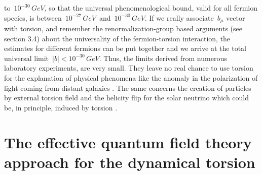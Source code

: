 to $\,10^{-30}\,GeV$, so that the universal phenomenological
bound, valid for all fermion species, is between $\,10^{-27}\,GeV\,$
and $\,10^{-30}\,GeV$. If we really associate $\,b_\mu$ vector 
with torsion, and remember the renormalization-group
based arguments (see section 3.4) about the universality 
of the fermion-torsion interaction, the estimates for different
fermions can be put together and we arrive at the total universal
limit $\,\left|b\right| < 10^{-30}\,GeV$.
Thus, the limits derived from numerous laboratory experiments, are 
very small. They leave no real chance to use torsion for the 
explanation of physical phenomena \cite{doma} like the anomaly in 
the polarization of light coming from distant galaxies 
\cite{nodrol}. The same concerns the creation of particles by 
external torsion field \cite{rump} and the helicity flip for the 
solar neutrino which could be, in principle, induced by torsion
\cite{hammond2}.
\vskip 10mm

\chapter{The effective quantum field theory approach for the 
dynamical torsion}

